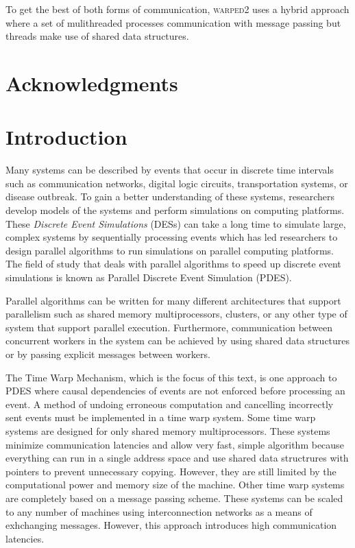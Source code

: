 \documentclass[11pt]{book}
\begin{document}
To get the best of both forms of communication, \textsc{warped2} uses a hybrid approach where
a set of mulithreaded processes communication with message passing but threads make use of shared
data structures.

\chapter*{Acknowledgments}



\tableofcontents \markright{ }
\listoffigures \markright{ }
\listoftables \markright{ }
\listofalgorithms \markright { }
\lstlistoflistings \markright{ }

\clearpage
{} \setcounter{page}{1}

\chapter{Introduction}\label{intro}

Many systems can be described by events that occur in discrete time intervals such as
communication networks, digital logic circuits, transportation systems, or disease
outbreak. To gain a better understanding of these systems, researchers develop models of
the systems and perform simulations on computing platforms. These \emph{Discrete Event
Simulations} (DESs) can take a long time to simulate large, complex systems by sequentially
processing events which has led researchers to design parallel algorithms to run simulations
on parallel computing platforms. The field of study that deals with parallel algorithms
to speed up discrete event simulations is known as Parallel Discrete Event Simulation (PDES).

Parallel algorithms can be written for many different architectures that support parallelism
such as shared memory multiprocessors, clusters, or any other type of system that support
parallel execution. Furthermore, communication between concurrent workers in the system can
be achieved by using shared data structures or by passing explicit messages between workers.

The Time Warp Mechanism\cite{jefferson-85}, which is the focus of this text, is one approach
to PDES where causal dependencies of events are not enforced before processing an event. A method
of undoing erroneous computation and cancelling incorrectly sent events must be implemented in
a time warp system.
Some time warp systems are designed for only shared memory multiprocessors. These systems
minimize communication latencies and allow very fast, simple algorithm because everything
can run in a single address space and use shared data structrures with pointers to prevent
unnecessary copying. However, they are still limited by the computational power and memory
size of the machine. Other time warp systems are completely based on a message passing scheme.
These systems can be scaled to any number of machines using interconnection networks as a means
of exhchanging messages. However, this approach introduces high communication latencies.
\end{document}
